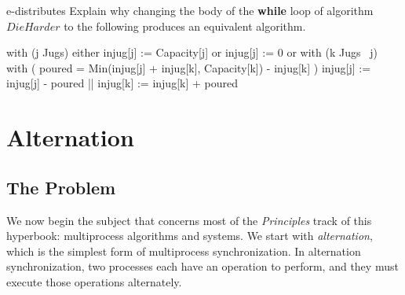 \documentclass[fleqn,leqno]{article}
\begin{document}
\begin{aquestion}{e-distributes}
Explain why changing the body of the \textbf{while} loop 
of algorithm $DieHarder$ to the following produces
an equivalent algorithm.
\begin{display}
\begin{nopcal}
with (j \in Jugs) 
  { either { injug[j] := Capacity[j] }
    or     { injug[j] := 0 } 
    or     with (k \in Jugs \ {j}) 
             { with ( poured = 
                        Min(injug[j] + injug[k], Capacity[k]) - injug[k] )
                 { injug[j] := injug[j] - poured ||
                   injug[k] := injug[k] + poured
                 }
             }
  }
\end{nopcal}
\begin{tlatex}
%
%
%
%
%
%
\end{tlatex}
\end{display}
\end{aquestion}
%




\newpage
{}%
 \vspace{-\baselineskip}%
\section{Alternation} 

\subsection{The Problem}

We now begin the subject that concerns most of the \emph{Principles}
track of this hyperbook: multiprocess algorithms and systems.  We
start with \emph{alternation}, which is the simplest form of
multiprocess synchronization.  In alternation synchronization, two
processes each have an operation to perform, and they must execute
those operations alternately.
\end{document}
